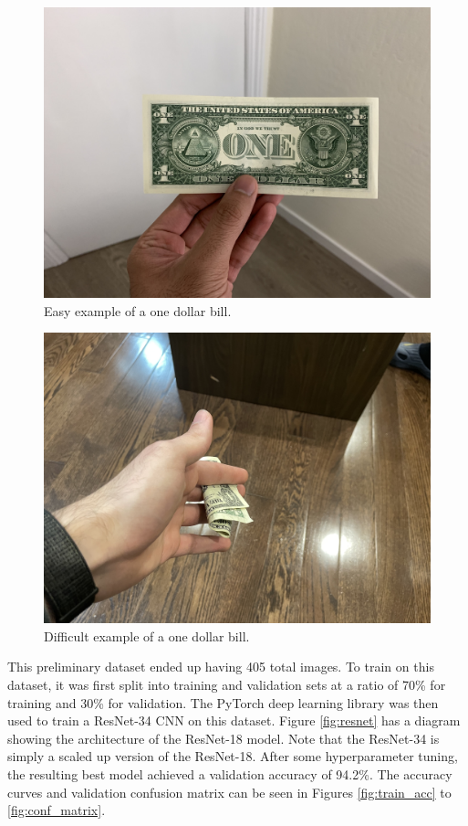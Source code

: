 \documentclass[a4paper,11pt]{article}
\begin{document}
\begin{figure}[H]
\centering
\includegraphics[scale=0.1]{img/cv_appendix/one_dollar_bill_nice.jpeg}
\caption{Easy example of a one dollar bill.}
\label{fig:one_dollar_nice}
\end{figure}

\begin{figure}[H]
\centering
\includegraphics[scale=0.1]{img/cv_appendix/one_dollar_bill_hard.jpeg}
\caption{Difficult example of a one dollar bill.}
\label{fig:one_dollar_hard}
\end{figure}

This preliminary dataset ended up having 405 total images. To train on this dataset, it was first split into training and validation sets at a ratio of 70\% for training and 30\% for validation. The PyTorch deep learning library was then used to train a ResNet-34 CNN on this dataset. Figure \ref{fig:resnet} has a diagram showing the architecture of the ResNet-18 model. Note that the ResNet-34 is simply a scaled up version of the ResNet-18. After some hyperparameter tuning, the resulting best model achieved a validation accuracy of 94.2\%. The accuracy curves and validation confusion matrix can be seen in Figures \ref{fig:train_acc} to \ref{fig:conf_matrix}.
\end{document}
